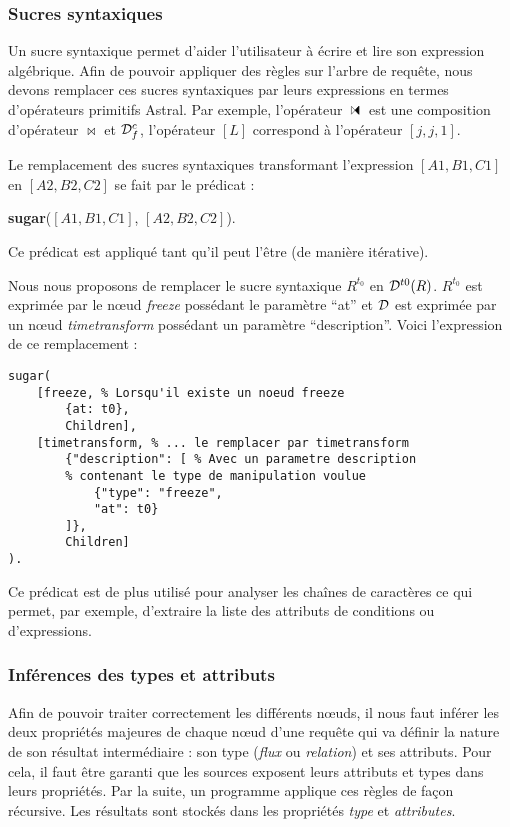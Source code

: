 \subsubsection{Sucres syntaxiques}
Un sucre syntaxique permet d'aider l'utilisateur à écrire et lire son expression algébrique. Afin de pouvoir appliquer des règles sur l'arbre de requête, nous devons remplacer ces sucres syntaxiques par leurs expressions en termes d'opérateurs primitifs Astral. Par exemple, l'opérateur $\ssjoin$ est une composition d'opérateur $\Join$ et $\mathcal{D}_f^c$, l'opérateur $[L]$ correspond à l'opérateur $[j,j,1]$.

\begin{regle}
Le remplacement des sucres syntaxiques transformant l'expression $[A1,B1,C1]$ en $[A2,B2,C2]$ se fait par le prédicat :
\begin{center} \textbf{sugar}($[A1,B1,C1]$, $[A2,B2,C2]$).\end{center}
Ce prédicat est appliqué tant qu'il peut l'être (de manière itérative).
\end{regle}

\begin{example}
	Nous nous proposons de remplacer le sucre syntaxique $R^{t_0}$ en $\mathcal{D}^{t0} (R)$. $R^{t_0}$ est exprimée par le nœud \textit{freeze} possédant le paramètre \enquote{at} et $\mathcal{D}$ est exprimée par un nœud \textit{timetransform} possédant un paramètre \enquote{description}. Voici l'expression de ce remplacement :
	\begin{lstlisting}
sugar(
	[freeze, % Lorsqu'il existe un noeud freeze
		{at: t0},
		Children], 
	[timetransform, % ... le remplacer par timetransform
		{"description": [ % Avec un parametre description
		% contenant le type de manipulation voulue
			{"type": "freeze", 
			"at": t0}
		]},
		Children]
).
	\end{lstlisting}
\end{example}

Ce prédicat est de plus utilisé pour analyser les chaînes de caractères ce qui permet, par exemple, d'extraire la liste des attributs de conditions ou d'expressions.

\subsubsection{Inférences des types et attributs}
Afin de pouvoir traiter correctement les différents nœuds, il nous faut inférer les deux propriétés majeures de chaque nœud d'une requête qui va définir la nature de son résultat intermédiaire : son type (\textit{flux} ou \textit{relation}) et ses attributs. Pour cela, il faut être garanti que les sources exposent leurs attributs et types dans leurs propriétés. Par la suite, un programme applique ces règles de façon récursive. Les résultats sont stockés dans les propriétés \textit{type} et \textit{attributes}.


